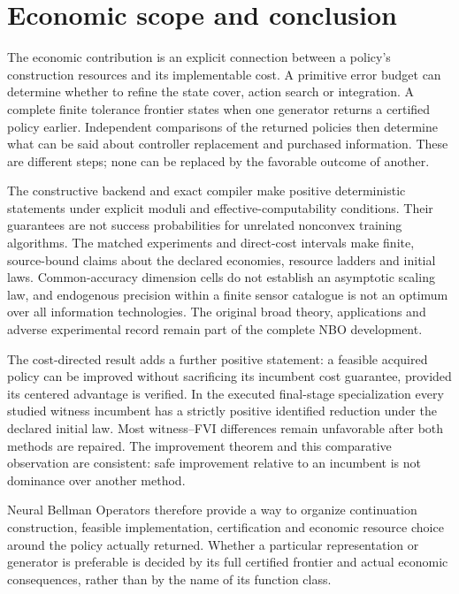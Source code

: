 \documentclass[ecta,nameyear,draft]{econsocart}
\begin{document}













\section{Economic scope and conclusion}\label{sec:conclusion49}
The economic contribution is an explicit connection between a policy's construction resources and its implementable cost. A primitive error budget can determine whether to refine the state cover, action search or integration. A complete finite tolerance frontier states when one generator returns a certified policy earlier. Independent comparisons of the returned policies then determine what can be said about controller replacement and purchased information. These are different steps; none can be replaced by the favorable outcome of another.

The constructive backend and exact compiler make positive deterministic statements under explicit moduli and effective-computability conditions. Their guarantees are not success probabilities for unrelated nonconvex training algorithms. The matched experiments and direct-cost intervals make finite, source-bound claims about the declared economies, resource ladders and initial laws. Common-accuracy dimension cells do not establish an asymptotic scaling law, and endogenous precision within a finite sensor catalogue is not an optimum over all information technologies. The original broad theory, applications and adverse experimental record remain part of the complete NBO development.

The cost-directed result adds a further positive statement: a feasible acquired policy can be improved without sacrificing its incumbent cost guarantee, provided its centered advantage is verified. In the executed final-stage specialization every studied witness incumbent has a strictly positive identified reduction under the declared initial law. Most witness--FVI differences remain unfavorable after both methods are repaired. The improvement theorem and this comparative observation are consistent: safe improvement relative to an incumbent is not dominance over another method.

Neural Bellman Operators therefore provide a way to organize continuation construction, feasible implementation, certification and economic resource choice around the policy actually returned. Whether a particular representation or generator is preferable is decided by its full certified frontier and actual economic consequences, rather than by the name of its function class.
\end{document}
